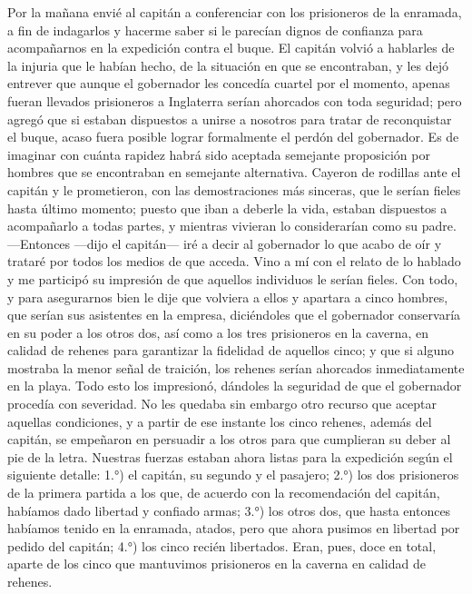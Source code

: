 \documentclass{novela}
\begin{document}
    Por la mañana envié al capitán a conferenciar con los prisioneros de la enramada, a fin de indagarlos y hacerme saber si le parecían dignos de confianza para acompañarnos en la expedición contra el buque. El capitán volvió a hablarles de la injuria que le habían hecho, de la situación en que se encontraban, y les dejó entrever que aunque el gobernador les concedía cuartel por el momento, apenas fueran llevados prisioneros a Inglaterra serían ahorcados con toda seguridad; pero agregó que si estaban dispuestos a unirse a nosotros para tratar de reconquistar el buque, acaso fuera posible lograr formalmente el perdón del gobernador.
    Es de imaginar con cuánta rapidez habrá sido aceptada semejante proposición por hombres que se encontraban en semejante alternativa. Cayeron de rodillas ante el capitán y le prometieron, con las demostraciones más sinceras, que le serían fieles hasta último momento; puesto que iban a deberle la vida, estaban dispuestos a acompañarlo a todas partes, y mientras vivieran lo considerarían como su padre. —Entonces —dijo el capitán— iré a decir al gobernador lo que acabo de oír y trataré por todos los medios de que acceda.
    Vino a mí con el relato de lo hablado y me participó su impresión de que aquellos individuos le serían fieles. Con todo, y para asegurarnos bien le dije que volviera a ellos y apartara a cinco hombres, que serían sus asistentes en la empresa, diciéndoles que el gobernador conservaría en su poder a los otros dos, así como a los tres prisioneros en la caverna, en calidad de rehenes para garantizar la fidelidad de aquellos cinco; y que si alguno mostraba la menor señal de traición, los rehenes serían ahorcados inmediatamente en la playa.
    Todo esto los impresionó, dándoles la seguridad de que el gobernador procedía con severidad. No les quedaba sin embargo otro recurso que aceptar aquellas condiciones, y a partir de ese instante los cinco rehenes, además del capitán, se empeñaron en persuadir a los otros para que cumplieran su deber al pie de la letra.
    Nuestras fuerzas estaban ahora listas para la expedición según el siguiente detalle:
    1.°) el capitán, su segundo y el pasajero;
    2.°) los dos prisioneros de la primera partida a los que, de acuerdo con la recomendación del capitán, habíamos dado libertad y confiado armas;
    3.°) los otros dos, que hasta entonces habíamos tenido en la enramada, atados, pero que ahora pusimos en libertad por pedido del capitán;
    4.°) los cinco recién libertados. Eran, pues, doce en total, aparte de los cinco que mantuvimos prisioneros en la caverna en calidad de rehenes.
\end{document}
